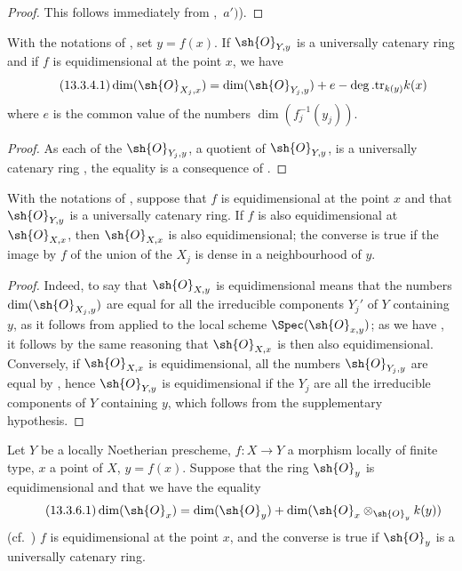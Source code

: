 \begin{proof}
This follows immediately from ,~$a')$).
\end{proof}

\begin{corollary}[13.3.4]
\label{IV.13.3.4}
With the notations of , set $y=f(x)$.
If $\sh{O}_{Y,y}$ is a universally catenary ring and if $f$ is equidimensional at the point $x$, we have
\[
\tag{13.3.4.1}
  \dim(\sh{O}_{X_j,x})=\dim(\sh{O}_{Y_j,y})+e-\deg.\mathrm{tr}_{k(y)}k(x)
\]
where $e$ is the common value of the numbers $\dim(f_j^{-1}(y_j))$.
\end{corollary}

\begin{proof}
As each of the $\sh{O}_{Y_j,y}$, a quotient of $\sh{O}_{Y,y}$, is a universally catenary ring , the equality is a consequence of .
\end{proof}

\begin{corollary}[13.3.5]
\label{IV.13.3.5}
With the notations of , suppose that $f$ is equidimensional at the point $x$ and that $\sh{O}_{Y,y}$ is a universally catenary ring.
If $f$ is also equidimensional at $\sh{O}_{X,x}$, then $\sh{O}_{X,x}$ is also equidimensional; the converse is true if the image by $f$ of the union of the $X_j$ is dense in a neighbourhood of $y$.
\end{corollary}

\begin{proof}
Indeed, to say that $\sh{O}_{X,y}$ is equidimensional means that the numbers $\dim(\sh{O}_{X_j,y})$ are equal for all the irreducible components $Y_j'$ of $Y$ containing $y$, as it follows from  applied to the local scheme $\Spec(\sh{O}_{x,y})$; as we have , it follows by the same reasoning that $\sh{O}_{X,x}$ is then also equidimensional.
Conversely, if $\sh{O}_{X,x}$ is equidimensional, all the numbers $\sh{O}_{Y_j,y}$ are equal by , hence $\sh{O}_{Y,y}$ is equidimensional if the $Y_j$ are all the irreducible components of $Y$ containing $y$, which follows from the supplementary hypothesis.
\end{proof}

\begin{proposition}[13.3.6]
\label{IV.13.3.6}
Let $Y$ be a locally Noetherian prescheme, $f:X\to Y$ a morphism locally of finite type, $x$ a point of $X$, $y=f(x)$.
Suppose that the ring $\sh{O}_y$ is equidimensional and that we have the equality
\[
\tag{13.3.6.1}
  \dim(\sh{O}_x)=\dim(\sh{O}_y)+\dim(\sh{O}_x\otimes_{\sh{O}_y}k(y))
\]
(cf.\ ) $f$ is equidimensional at the point $x$, and the converse is true if $\sh{O}_y$ is a universally catenary ring.
\end{proposition}

